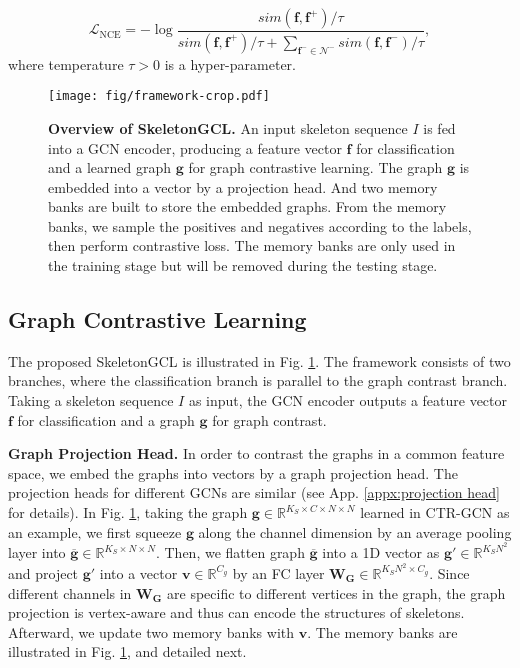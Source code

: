 \documentclass{article} \usepackage{iclr2023_conference,times}
\begin{document}
\begin{equation}
    \label{eq:contrastive loss}
    \mathcal{L}_\text{NCE} = -\log{\frac{sim(\mathbf{f}, \mathbf{f^+})/\tau}{sim(\mathbf{f}, \mathbf{f^+})/\tau+\sum_{\mathbf{f^-} \in {\mathcal{N^-}}}{sim(\mathbf{f}, \mathbf{f^-})/\tau}}},
\end{equation}
where temperature $\tau > 0$ is a hyper-parameter.
\begin{figure}[t]
    \centering
    \texttt{[image: fig/framework-crop.pdf]}
    \caption{\textbf{Overview of SkeletonGCL.} An input skeleton sequence $I$ is fed into a GCN encoder, producing a feature vector $\mathbf{f}$ for classification and a learned graph $\mathbf{g}$ for graph contrastive learning. The graph $\mathbf{g}$ is embedded into a vector by a projection head. And two memory banks are built to store the embedded graphs. From the memory banks, we sample the positives and negatives according to the labels, then perform contrastive loss. The memory banks are only used in the training stage but will be removed during the testing stage.}
    \label{fig:framework}
\end{figure}
\subsection{Graph Contrastive Learning} The proposed SkeletonGCL is illustrated in Fig. \ref{fig:framework}. The framework consists of two branches, where the classification branch is parallel to the graph contrast branch. Taking a skeleton sequence $I$ as input, the GCN encoder outputs a feature vector $\mathbf{f}$ for classification and a graph $\mathbf{g}$ for graph contrast. 

\noindent \textbf{Graph Projection Head.} In order to contrast the graphs in a common feature space, we embed the graphs into vectors by a graph projection head. The projection heads for different GCNs are similar (see App. \ref{appx:projection head} for details). In Fig. \ref{fig:framework}, taking the graph $\mathbf{g} \in \mathbb{R}^{K_S \times C \times N \times N}$ learned in CTR-GCN \citep{CTRGCN} as an example, we first squeeze $\mathbf{g}$ along the channel dimension by an average pooling layer into $\mathbf{\overline{g}} \in \mathbb{R}^{K_S \times N \times N}$. 
Then, we flatten graph $\overline{\mathbf{g}}$ into a 1D vector as $\mathbf{g'} \in \mathbb{R}^{K_S N^2}$ and project $\mathbf{g'}$ into a vector $\mathbf{v} \in \mathbb{R}^{C_g}$ by an FC layer $\mathbf{W_G} \in \mathbb{R}^{K_S N^2 \times C_g}$. Since different channels in $\mathbf{W_G}$ are specific to different vertices in the graph, the graph projection is vertex-aware and thus can encode the structures of skeletons. Afterward, we update two memory banks with $\mathbf{v}$. The memory banks are illustrated in Fig. \ref{fig:framework}, and detailed next.
\end{document}
